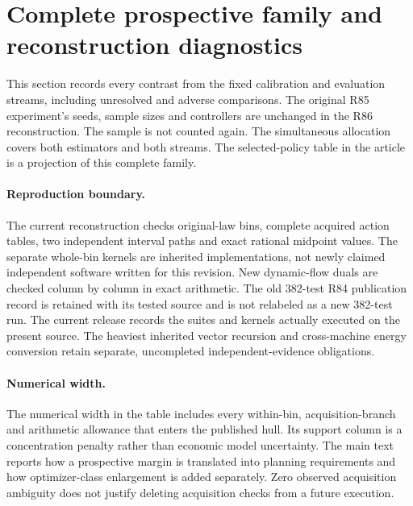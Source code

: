 \section{Complete prospective family and reconstruction diagnostics}\label{sec:catalogue86}
This section records every contrast from the fixed calibration and evaluation streams, including unresolved and adverse comparisons. The original R85 experiment's seeds, sample sizes and controllers are unchanged in the R86 reconstruction. The sample is not counted again. The simultaneous allocation covers both estimators and both streams. The selected-policy table in the article is a projection of this complete family.


\paragraph{Reproduction boundary.}
The current reconstruction checks original-law bins, complete acquired action tables, two independent interval paths and exact rational midpoint values. The separate whole-bin kernels are inherited implementations, not newly claimed independent software written for this revision. New dynamic-flow duals are checked column by column in exact arithmetic. The old 382-test R84 publication record is retained with its tested source and is not relabeled as a new 382-test run. The current release records the suites and kernels actually executed on the present source. The heaviest inherited vector recursion and cross-machine energy conversion retain separate, uncompleted independent-evidence obligations.
\paragraph{Numerical width.}
The numerical width in the table includes every within-bin, acquisition-branch and arithmetic allowance that enters the published hull. Its support column is a concentration penalty rather than economic model uncertainty. The main text reports how a prospective margin is translated into planning requirements and how optimizer-class enlargement is added separately. Zero observed acquisition ambiguity does not justify deleting acquisition checks from a future execution.
